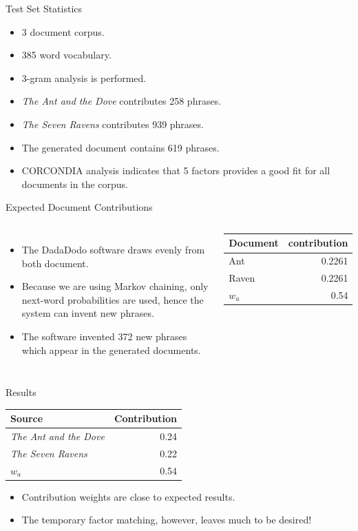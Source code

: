 \documentclass{beamer}
\begin{document}
\begin{frame}{Test Set Statistics}
    \begin{itemize}[<+->]
        \item 3 document corpus.
        \item 385 word vocabulary.
        \item 3-gram analysis is performed.
        \item {\em The Ant and the Dove} contributes 258 phrases.
        \item {\em The Seven Ravens} contributes 939 phrases.
        \item The generated document contains 619 phrases.
        \item CORCONDIA analysis indicates that 5 factors provides a good fit for all documents in the corpus.
    \end{itemize}
\end{frame}

\begin{frame}{Expected Document Contributions}
    \begin{columns}
        \begin{itemize}[<+->]
            \item The DadaDodo software draws evenly from both document.
            \item Because we are using Markov chaining, only next-word probabilities are used, hence the system can invent new phrases.
            \item The software invented 372 new phrases which appear in the generated documents.
        \end{itemize}
        \begin{tabular}{l|r}
        {\bf Document} & {\bf contribution} \\
        \hline
        Ant &  0.2261 \\
        Raven & 0.2261 \\
        $w_a$ & 0.54 \\
        \end{tabular}
    \end{columns}
\end{frame}

\begin{frame}{Results}
    \begin{tabular}{l|r}
        {\bf Source} & {\bf Contribution} \\
        \hline
        {\em The Ant and the Dove} & 0.24 \\
        {\em The Seven Ravens} & 0.22 \\
        $w_a$ & 0.54
    \end{tabular}
    \begin{itemize}[<+->]
        \item Contribution weights are close to expected results.
        \item The temporary factor matching, however, leaves much to be desired!
    \end{itemize}
\end{frame}
\end{document}
